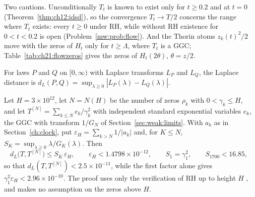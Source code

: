 Two cautions. Unconditionally $T_t$ is known to exist only for $t\ge0.2$ and at $t=0$ (Theorem~\ref{thm:ch12:idsd}), so the convergence $T_t\to T/2$ concerns the range where $T_t$ exists: every $t\ge0$ under RH, while without RH existence for $0<t<0.2$ is open (Problem~\ref{mw:prob:flow}). And the Thorin atoms $z_k(t)^2/2$ move with the zeros of $H_t$ only for $t\ge\Lambda$, where $T_t$ is a GGC; Table~\ref{tab:ch21:flowzeros} gives the zeros of $H_t(2\theta)$, $\theta=z/2$.

\begin{definition}\label{mw:def:laplace}
For laws $P$ and $Q$ on $[0,\infty)$ with Laplace transforms $L_P$ and $L_Q$, the Laplace distance is $d_L(P,Q)=\sup_{\lambda\ge0}|L_P(\lambda)-L_Q(\lambda)|$.
\end{definition}

\begin{proposition}\label{mw:prop:approx}
Let $H=3\times10^{12}$, let $N=N(H)$ be the number of zeros $\rho_k$ with $0<\gamma_k\le H$, and let $T^{[N]}=\sum_{k\le N}e_k/\gamma_k^2$ with independent standard exponential variables $e_k$, the GGC with transform $1/G_N$ of Section~\ref{sec:weak:limits}. With $a_k$ as in Section~\ref{ch:clock}, put $\varepsilon_H=\sum_{k>N}1/|a_k|$ and, for $K\le N$, $S_K=\sup_{\lambda\ge0}\lambda/G_K(\lambda)$. Then
\begin{equation}\label{mw:eq:approxbound}
d_L\big(T,T^{[N]}\big)\le S_K\,\varepsilon_H,\qquad \varepsilon_H<1.4798\times10^{-12},\qquad S_1=\gamma_1^2,\qquad S_{1700}<16.85,
\end{equation}
so that $d_L(T,T^{[N]})<2.5\times10^{-11}$, while the first factor alone gives $\gamma_1^2\varepsilon_H<2.96\times10^{-10}$.
The proof uses only the verification of RH up to height $H$ \cite{PT21}, and makes no assumption on the zeros above $H$.
\end{proposition}

